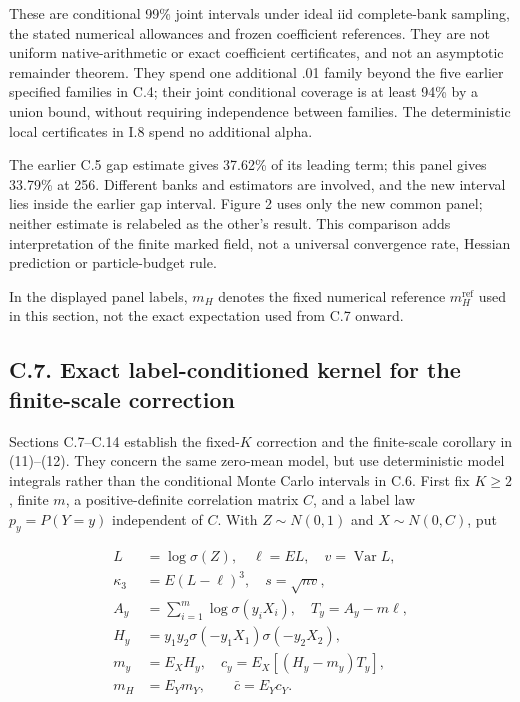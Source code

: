 \documentclass{article}
\begin{document}
These are conditional 99\% joint intervals under ideal iid complete-bank
sampling, the stated numerical allowances and frozen coefficient
references. They are not uniform native-arithmetic or exact coefficient
certificates, and not an asymptotic remainder theorem. They spend one
additional .01 family beyond the five earlier specified families in C.4;
their joint conditional coverage is at least 94\% by a union bound,
without requiring independence between families. The deterministic local
certificates in I.8 spend no additional alpha.

The earlier C.5 gap estimate gives 37.62\% of its leading term; this
panel gives 33.79\% at 256. Different banks and estimators are involved,
and the new interval lies inside the earlier gap interval. Figure 2 uses
only the new common panel; neither estimate is relabeled as the other's
result. This comparison adds interpretation of the finite marked field,
not a universal convergence rate, Hessian prediction or particle-budget
rule.

In the displayed panel labels, \(m_H\) denotes the fixed numerical
reference \(m_H^{\mathrm{ref}}\) used in this section, not the exact
expectation used from C.7 onward.

\subsection*{C.7. Exact label-conditioned kernel for the finite-scale
correction}\label{fixed-k-correction}

Sections C.7--C.14 establish the fixed-\(K\) correction and the
finite-scale corollary in (11)--(12). They concern the same zero-mean
model, but use deterministic model integrals rather than the conditional
Monte Carlo intervals in C.6. First fix \(K\ge2\), finite \(m\), a
positive-definite correlation matrix \(C\), and a label law
\(p_y=P(Y=y)\) independent of \(C\). With \(Z\sim N(0,1)\) and
\(X\sim N(0,C)\), put

\[
\begin{aligned}
L&=\log\sigma(Z),\quad \ell=EL,\quad v=\operatorname{Var}L,\\
\kappa_3&=E(L-\ell)^3,\quad s=\sqrt{nv},\\
A_y&=\sum_{i=1}^m\log\sigma(y_iX_i),\quad T_y=A_y-m\ell,\\
H_y&=y_1y_2\sigma(-y_1X_1)\sigma(-y_2X_2),\\
m_y&=E_XH_y,\quad c_y=E_X[(H_y-m_y)T_y],\\
m_H&=E_Ym_Y,\qquad \bar c=E_Yc_Y.
\end{aligned}
\tag{C.19}
\]
\end{document}
